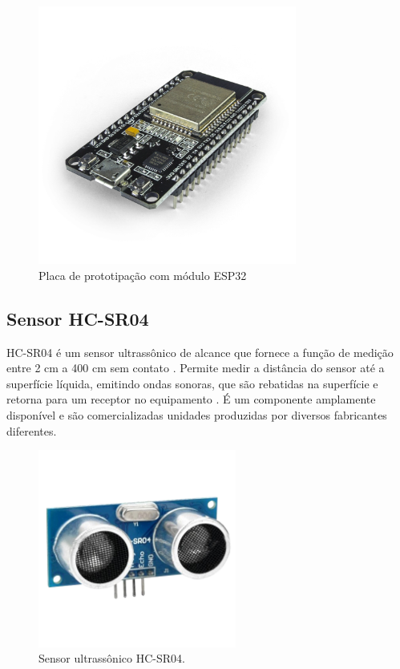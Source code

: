 \begin{figure}[ht]
    \centering
    \includegraphics[width=8.5cm]{imagem/esp-wroom32.png} 
    \caption{Placa de prototipação com módulo ESP32}
    \label{fig:esp32-module}
\end{figure}

\subsection{Sensor HC-SR04}
HC-SR04 é um sensor ultrassônico de alcance que fornece a função de medição entre 2 cm a 400 cm sem contato \cite{electro}. Permite medir a distância do sensor até a superfície líquida, emitindo ondas sonoras, que são rebatidas na superfície e retorna para um receptor no equipamento \cite{tairaprototipagem}. É um componente amplamente disponível e são comercializadas unidades produzidas por diversos fabricantes diferentes.

\begin{figure}[ht]
    \centering
    \includegraphics[width=6.5cm]{imagem/hc-sr04.png} 
    \caption{Sensor ultrassônico HC-SR04.}
    \label{fig:hc-sr04}
\end{figure}

